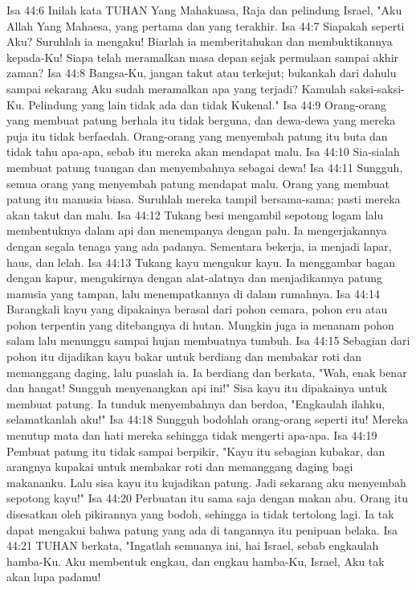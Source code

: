 Isa 44:6  Inilah kata TUHAN Yang Mahakuasa, Raja dan pelindung Israel, "Aku Allah Yang Mahaesa, yang pertama dan yang terakhir.
Isa 44:7  Siapakah seperti Aku? Suruhlah ia mengaku! Biarlah ia memberitahukan dan membuktikannya kepada-Ku! Siapa telah meramalkan masa depan sejak permulaan sampai akhir zaman?
Isa 44:8  Bangsa-Ku, jangan takut atau terkejut; bukankah dari dahulu sampai sekarang Aku sudah meramalkan apa yang terjadi? Kamulah saksi-saksi-Ku. Pelindung yang lain tidak ada dan tidak Kukenal."
Isa 44:9  Orang-orang yang membuat patung berhala itu tidak berguna, dan dewa-dewa yang mereka puja itu tidak berfaedah. Orang-orang yang menyembah patung itu buta dan tidak tahu apa-apa, sebab itu mereka akan mendapat malu.
Isa 44:10  Sia-sialah membuat patung tuangan dan menyembahnya sebagai dewa!
Isa 44:11  Sungguh, semua orang yang menyembah patung mendapat malu. Orang yang membuat patung itu manusia biasa. Suruhlah mereka tampil bersama-sama; pasti mereka akan takut dan malu.
Isa 44:12  Tukang besi mengambil sepotong logam lalu membentuknya dalam api dan menempanya dengan palu. Ia mengerjakannya dengan segala tenaga yang ada padanya. Sementara bekerja, ia menjadi lapar, haus, dan lelah.
Isa 44:13  Tukang kayu mengukur kayu. Ia menggambar bagan dengan kapur, mengukirnya dengan alat-alatnya dan menjadikannya patung manusia yang tampan, lalu menempatkannya di dalam rumahnya.
Isa 44:14  Barangkali kayu yang dipakainya berasal dari pohon cemara, pohon eru atau pohon terpentin yang ditebangnya di hutan. Mungkin juga ia menanam pohon salam lalu menunggu sampai hujan membuatnya tumbuh.
Isa 44:15  Sebagian dari pohon itu dijadikan kayu bakar untuk berdiang dan membakar roti dan memanggang daging, lalu puaslah ia. Ia berdiang dan berkata, "Wah, enak benar dan hangat! Sungguh menyenangkan api ini!" Sisa kayu itu dipakainya untuk membuat patung. Ia tunduk menyembahnya dan berdoa, "Engkaulah ilahku, selamatkanlah aku!"
Isa 44:18  Sungguh bodohlah orang-orang seperti itu! Mereka menutup mata dan hati mereka sehingga tidak mengerti apa-apa.
Isa 44:19  Pembuat patung itu tidak sampai berpikir, "Kayu itu sebagian kubakar, dan arangnya kupakai untuk membakar roti dan memanggang daging bagi makananku. Lalu sisa kayu itu kujadikan patung. Jadi sekarang aku menyembah sepotong kayu!"
Isa 44:20  Perbuatan itu sama saja dengan makan abu. Orang itu disesatkan oleh pikirannya yang bodoh, sehingga ia tidak tertolong lagi. Ia tak dapat mengakui bahwa patung yang ada di tangannya itu penipuan belaka.
Isa 44:21  TUHAN berkata, "Ingatlah semuanya ini, hai Israel, sebab engkaulah hamba-Ku. Aku membentuk engkau, dan engkau hamba-Ku, Israel, Aku tak akan lupa padamu!
